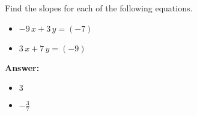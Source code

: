  Find the slopes for each of the following equations. \begin{itemize}\item \( -9 \, x + 3 \, y = \left(-7\right) \)\item \( 3 \, x + 7 \, y = \left(-9\right) \)\end{itemize}

        \textbf{Answer:} \begin{itemize}\item \( 3 \)\item \( -\frac{3}{7} \)\end{itemize}
